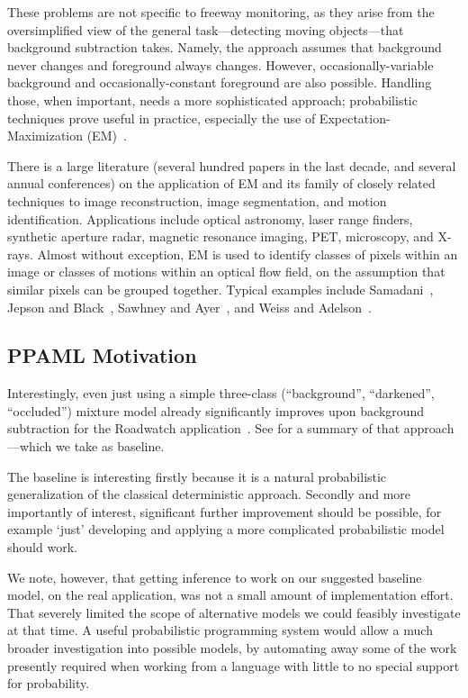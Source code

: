 These problems are not specific to freeway monitoring, as they arise
from the oversimplified view of the
general task---detecting moving objects---that
background subtraction takes.  Namely, the approach assumes that
background never changes and foreground always changes.  However,
occasionally-variable background and occasionally-constant
foreground are also possible.  Handling those, when important, needs a
more sophisticated approach; probabilistic techniques prove useful in practice,
especially the use of Expectation-Maximization (EM)~\cite{Dempster+al:1977}.

There is a large literature (several hundred papers in the last
decade, and several annual conferences) on the application
of EM and its family of closely related techniques
to image reconstruction, image segmentation, and
motion identification.   Applications include optical astronomy, laser
range finders, synthetic aperture radar, magnetic resonance imaging, PET, microscopy, and
X-rays.  Almost without exception, EM is used to identify classes of
pixels within an image or classes of motions within an optical flow
field, on the assumption that similar pixels can be grouped
together. Typical examples include Samadani~\cite{Samadani:1995},
Jepson and Black~\cite{Jepson+Black:1993}, Sawhney and
Ayer~\cite{Sawhney+Ayer:1996}, and Weiss and
Adelson~\cite{Weiss+Adelson:1996}.

\subsection{PPAML Motivation}

Interestingly, even just using a simple three-class (``background'', ``darkened'',
``occluded'') mixture model already significantly improves upon
background subtraction for the Roadwatch application~\cite{friedman97uai}.  See
 for a summary of
that approach---which we take as baseline.

The baseline is interesting firstly because it is a natural
probabilistic generalization of the
classical deterministic approach.
Secondly and more importantly of interest, significant further
improvement should be possible, for example `just' developing and
applying a more complicated probabilistic model should work.

We note, however, that getting inference to work on our suggested baseline
model, on the real application, was not a small amount of
implementation effort.  That severely limited the scope of alternative models we could
feasibly investigate at that time.  A useful probabilistic programming
system would allow a much broader investigation into possible models,
by automating away some of the work presently required when working
from a language with little to no special support for probability.


